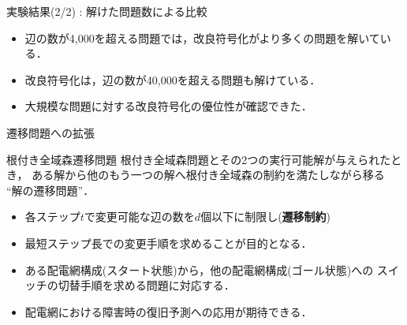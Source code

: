 \documentclass[dvipdfmx,11pt]{beamer}
\begin{document}
\begin{frame}{実験結果(2/2) : 解けた問題数による比較}

\begin{table}[t]
 \centering
 
\end{table}

\begin{itemize}
\item 辺の数が4,000を超える問題では，改良符号化がより多くの問題を解いている．
\item 改良符号化は，辺の数が40,000を超える問題も解けている．
\item 大規模な問題に対する改良符号化の優位性が確認できた．
\end{itemize}
\end{frame}
\begin{frame}{遷移問題への拡張}

\begin{alertblock}{根付き全域森遷移問題}
  根付き全域森問題とその2つの実行可能解が与えられたとき，
  ある解から他のもう一つの解へ根付き全域森の制約を満たしながら移る
  ``解の遷移問題''．
  \begin{itemize}
  \item 各ステップ$t$で変更可能な辺の数を$d$個以下に制限し(\textbf{遷移制約})
  \item 最短ステップ長での変更手順を求めることが目的となる．
  \end{itemize}
\end{alertblock}
\vfill  
\begin{itemize}
\item ある配電網構成(スタート状態)から，他の配電網構成(ゴール状態)への
  スイッチの切替手順を求める問題に対応する．
\item 配電網における障害時の復旧予測への応用が期待できる．
\end{itemize} 
\end{frame}
\end{document}
